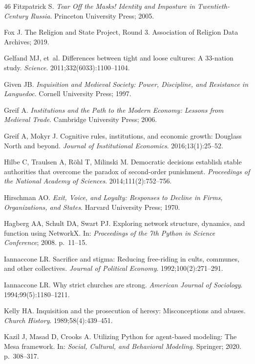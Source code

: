 \documentclass[12pt]{article}
\begin{document}
\begin{thebibliography}{46}
Fitzpatrick S.
\textit{Tear Off the Masks! Identity and Imposture in Twentieth-Century Russia}.
Princeton University Press; 2005.

Fox J.
The Religion and State Project, Round 3.
Association of Religion Data Archives; 2019.

Gelfand MJ, et~al.
Differences between tight and loose cultures: A 33-nation study.
\textit{Science}. 2011;332(6033):1100--1104.

Given JB.
\textit{Inquisition and Medieval Society: Power, Discipline, and Resistance in Languedoc}.
Cornell University Press; 1997.

Greif A.
\textit{Institutions and the Path to the Modern Economy: Lessons from Medieval Trade}.
Cambridge University Press; 2006.

Greif A, Mokyr J.
Cognitive rules, institutions, and economic growth: Douglass North and beyond.
\textit{Journal of Institutional Economics}. 2016;13(1):25--52.

Hilbe C, Traulsen A, R\"{o}hl T, Milinski M.
Democratic decisions establish stable authorities that overcome the paradox of second-order punishment.
\textit{Proceedings of the National Academy of Sciences}. 2014;111(2):752--756.

Hirschman AO.
\textit{Exit, Voice, and Loyalty: Responses to Decline in Firms, Organizations, and States}.
Harvard University Press; 1970.

Hagberg AA, Schult DA, Swart PJ.
Exploring network structure, dynamics, and function using NetworkX.
In: \textit{Proceedings of the 7th Python in Science Conference}; 2008. p.~11--15.

Iannaccone LR.
Sacrifice and stigma: Reducing free-riding in cults, communes, and other collectives.
\textit{Journal of Political Economy}. 1992;100(2):271--291.

Iannaccone LR.
Why strict churches are strong.
\textit{American Journal of Sociology}. 1994;99(5):1180--1211.

Kelly HA.
Inquisition and the prosecution of heresy: Misconceptions and abuses.
\textit{Church History}. 1989;58(4):439--451.

Kazil J, Masad D, Crooks A.
Utilizing Python for agent-based modeling: The Mesa framework.
In: \textit{Social, Cultural, and Behavioral Modeling}. Springer; 2020. p.~308--317.


\end{thebibliography}
\end{document}
